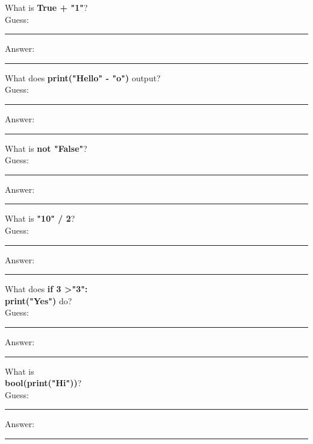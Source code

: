 \documentclass{article}
\begin{document}
\begin{tasks}[
    style=enumerate,
    label-format=\bfseries,
    label-width=1.5em,
    item-indent=2em,
    column-sep=1em,
    after-item-skip=2em
  ]
        \task What is \textbf{True + "1"}?  \\
        Guess:  \vspace{3mm}\\
        \rule{\linewidth}{0.4pt} %
        Answer:  \vspace{3mm}\\
        \rule{\linewidth}{0.4pt} %

        \task What does \textbf{print("Hello" - "o")} output?  \\
        Guess:  \vspace{3mm}\\
        \rule{\linewidth}{0.4pt} %
        Answer:  \vspace{3mm}\\
        \rule{\linewidth}{0.4pt} %

        \task What is \textbf{not "False"}?  \\
        Guess:  \vspace{3mm}\\
        \rule{\linewidth}{0.4pt} %
        Answer:  \vspace{3mm}\\
        \rule{\linewidth}{0.4pt} %

        \task What is \textbf{"10" / 2}?  \\
        Guess:  \vspace{3mm}\\
        \rule{\linewidth}{0.4pt} %
        Answer:  \vspace{3mm}\\
        \rule{\linewidth}{0.4pt} %

        \task What does \textbf{if 3 \textgreater "3":}\\
        \textbf{ print("Yes")} do?  \\
        Guess:  \vspace{3mm}\\
        \rule{\linewidth}{0.4pt} %
        Answer:  \vspace{3mm}\\
        \rule{\linewidth}{0.4pt} %

        \task What is \\
        \textbf{bool(print("Hi"))}?  \\
        Guess:  \vspace{3mm}\\
        \rule{\linewidth}{0.4pt} %
        Answer:  \vspace{3mm}\\
        \rule{\linewidth}{0.4pt} %



\end{tasks}
\end{document}
